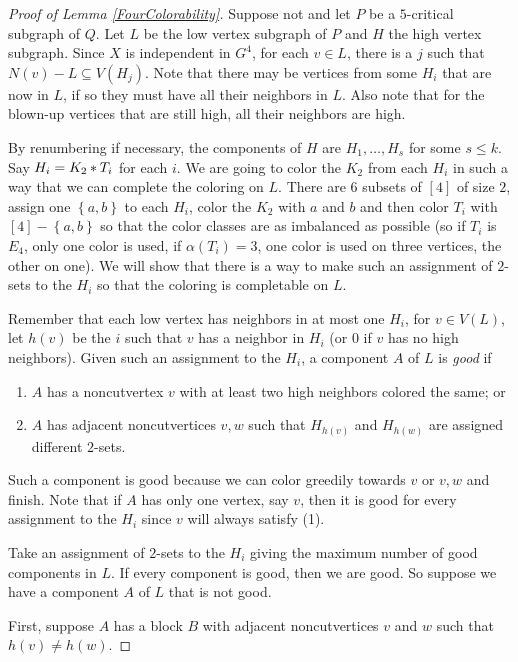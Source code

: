 \documentclass[12pt]{article}
\theoremstyle{plain}
\theoremstyle{definition}
\theoremstyle{remark}
\newcommand{\set}[1]{\left\{ #1 \right\}}
\newcommand{\irange}[1]{\left[#1\right]}
\newcommand{\join}[2]{#1 \mbox{\hspace{2 pt}$\ast$\hspace{2 pt}} #2}
\begin{document}
\begin{proof}[Proof of Lemma \ref{FourColorability}]
Suppose not and let $P$ be a $5$-critical subgraph of $Q$.  Let $L$ be the low vertex subgraph of $P$ and $H$ the high vertex subgraph. Since $X$ is independent in $G^4$, for each $v \in L$, there is a $j$ such that $N(v) - L \subseteq V(H_j)$.  Note that there may be vertices from some $H_i$ that are now in $L$, if so they must have all their neighbors in $L$.   Also note that for the blown-up vertices that are still high, all their neighbors are high.

By renumbering if necessary, the components of $H$ are $H_1, \ldots, H_s$ for some $s \le k$.   Say $H_i = \join{K_2}{T_i}$ for each $i$.  We are going to color the $K_2$ from each $H_i$ in such a way that we can complete the coloring on $L$.  There are $6$ subsets of $\irange{4}$ of size $2$, assign one $\set{a,b}$ to each $H_i$, color the $K_2$ with $a$ and $b$ and then color $T_i$ with $\irange{4} - \set{a,b}$ so that the color classes are as imbalanced as possible (so if $T_i$ is $E_4$, only one color is used, if $\alpha(T_i) = 3$, one color is used on three vertices, the other on one).  We will show that there is a way to make such an assignment of $2$-sets to the $H_i$ so that the coloring is completable on $L$.

Remember that each low vertex has neighbors in at most one $H_i$, for $v \in V(L)$, let $h(v)$ be the $i$ such that $v$ has a neighbor in $H_i$ (or $0$ if $v$ has no high neighbors). Given such an assignment to the $H_i$, a component $A$ of $L$ is \emph{good} if 

\begin{enumerate}
\item $A$ has a noncutvertex $v$ with at least two high neighbors colored the same; or
\item $A$ has adjacent noncutvertices $v, w$ such that $H_{h(v)}$ and $H_{h(w)}$ are assigned different $2$-sets.
\end{enumerate}

Such a component is good because we can color greedily towards $v$ or $v,w$ and finish.  Note that if $A$ has only one vertex, say $v$, then it is good for every assignment to the $H_i$ since $v$ will always satisfy (1).

Take an assignment of $2$-sets to the $H_i$ giving the maximum number of good components in $L$.  
If every component is good, then we are good.  So suppose we have a component $A$ of $L$ that is not good.

First, suppose $A$ has a block $B$ with adjacent noncutvertices $v$ and $w$ such that $h(v) \ne h(w)$.



\end{proof}




\end{document}
